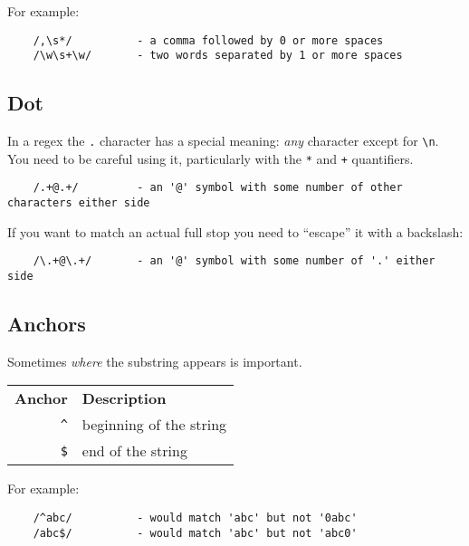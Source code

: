 For example:

\begin{verbatim}
    /,\s*/          - a comma followed by 0 or more spaces
    /\w\s+\w/       - two words separated by 1 or more spaces
\end{verbatim}


\subsection{Dot}

In a regex the \texttt{.} character has a special meaning: \textit{any} character except for \texttt{\textbackslash n}. You need to be careful using it, particularly with the \texttt{*} and \texttt{+} quantifiers.
\\

\begin{verbatim}
    /.+@.+/         - an '@' symbol with some number of other characters either side
\end{verbatim}

If you want to match an actual full stop you need to ``escape'' it with a backslash:

\begin{verbatim}
    /\.+@\.+/       - an '@' symbol with some number of '.' either side
\end{verbatim}



\subsection{Anchors}

Sometimes \textit{where} the substring appears is important.

\begin{center}
    \begin{small}
        \begin{tabu}{r l}
            \textbf{Anchor}             & \textbf{Description} \\
            \texttt{\textasciicircum}   & beginning of the string \\
            \texttt{\$}                 & end of the string \\
        \end{tabu}
    \end{small}
\end{center}

For example:

\begin{verbatim}
    /^abc/          - would match 'abc' but not '0abc'
    /abc$/          - would match 'abc' but not 'abc0'
\end{verbatim}


